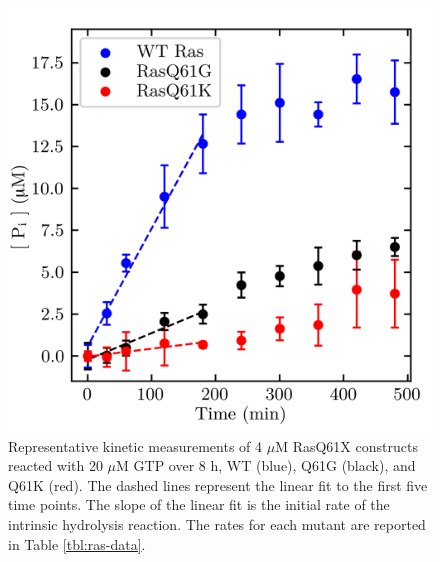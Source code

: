 \begin{figure}
    \center
    \includegraphics[width=\single]{figures-ras/modelCurvesFigure.png}
    \caption[Representative kinetic measurements of RasQ61X constructs]{
        Representative kinetic measurements of 4 $\mu$M RasQ61X constructs reacted with 20 $\mu$M GTP over 8 h, WT (blue), Q61G (black), and Q61K (red). 
        The dashed lines represent the linear fit to the first five time points. 
        The slope of the linear fit is the initial rate of the intrinsic hydrolysis reaction. 
        The rates for each mutant are reported in Table \ref{tbl:ras-data}.}
    \label{fig:ras-curves}
\end{figure}

